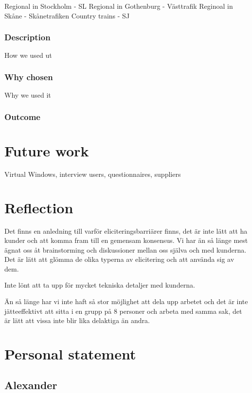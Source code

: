 \documentclass[a4paper]{article}
\begin{document}
    Regional in Stockholm - SL
    Regional in Gothenburg - Västtrafik
    Reginoal in Skåne - Skånetrafiken
    Country trains - SJ
    
    \subsubsection{Description}
    How we used ut
    \subsubsection{Why chosen}
    Why we used it
    \subsubsection{Outcome}
    
  \section{Future work}
  Virtual Windows, interview users, questionnaires, suppliers
  
  \section{Reflection}
  Det finns en anledning till varför eliciteringsbarriärer finns, det är inte lätt att ha kunder och att komma fram till en gemensam konsensus.
  Vi har än så länge mest ägnat oss åt brainstorming och diskussioner mellan oss själva och med kunderna. Det är lätt att glömma de olika typerna av elicitering och att använda sig av dem. 
  
  Inte lönt att ta upp för mycket tekniska detaljer med kunderna.

Än så länge har vi inte haft så stor möjlighet att dela upp arbetet och det är inte jätteeffektivt att sitta i en grupp på 8 personer och arbeta med samma sak, det är lätt att vissa inte blir lika delaktiga än andra. 


  \section{Personal statement}
  
  \subsection{Alexander}
\end{document}
